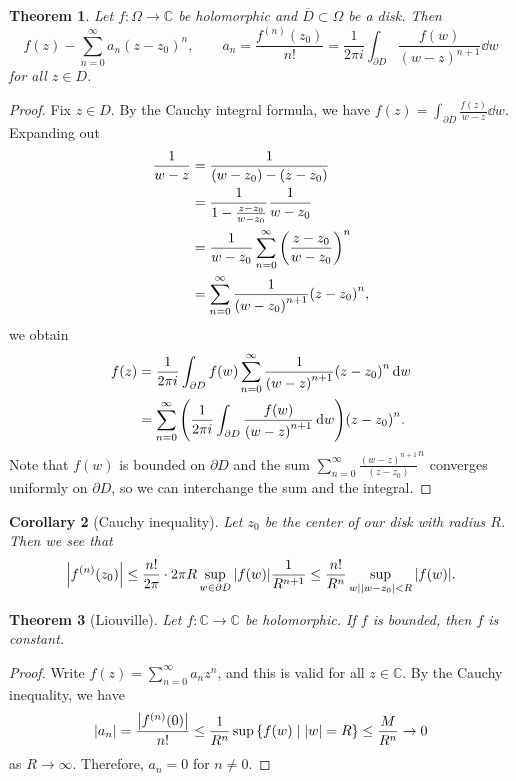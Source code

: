 \documentclass[leqno, openany]{memoir}
\newtheorem{thm}{Theorem}[section]
\newtheorem{cor}[thm]{Corollary}
\theoremstyle{definition}
\theoremstyle{remark}
\theoremstyle{plain}
\theoremstyle{definition}
\theoremstyle{remark}
\newcommand{\C}{\mathbb{C}}
\newcommand{\ol}[1]{\overline{#1}}
\begin{document}
\begin{thm}
    Let $f \colon \Omega \to \C$ be holomorphic and $\ol{D} \subset \Omega$ be a disk. Then 
    \[ f(z) - \sum_{n=0}^{\infty} a_n{(z-z_0)}^n, \qquad a_n = \frac{f^{(n)}(z_0)}{n!} = \frac{1}{2 \pi i} \int_{\partial D} \frac{f(w)}{{(w-z)}^{n+1}} \dd{w} \]
    for all $z \in D$.
\end{thm}

\begin{proof}
    Fix $z \in D$. By the Cauchy integral formula, we have $f(z) = \int_{\partial D} \frac{f(z)}{w-z} \dd{w}$. Expanding out
    \begin{align*} 
        \frac{1}{w-z} &= \frac{1}{(w-z_0) - (z-z_0)} \\
                      &= \frac{1}{1-\frac{z-z_0}{w-z_0}} \frac{1}{w-z_0} \\
                      &= \frac{1}{w-z_0} \sum_{n=0}^{\infty} {\qty(\frac{z-z_0}{w-z_0})}^n \\
                      &= \sum_{n=0}^{\infty} \frac{1}{{(w-z_0)}^{n+1}} {(z-z_0)}^n,
    \end{align*}
    we obtain
    \begin{align*}
        f(z) &= \frac{1}{2 \pi i} \int_{\partial D} f(w) \sum_{n=0}^{\infty} \frac{1}{{(w-z)}^{n+1}} {(z-z_0)}^n \dd{w} \\
             &= \sum_{n=0}^{\infty} \qty(\frac{1}{2 \pi i} \int_{\partial D} \frac{f(w)}{{(w-z)}^{n+1}} \dd{w}) {(z-z_0)}^n.
    \end{align*}
    Note that $f(w)$ is bounded on $\partial D$ and the sum $\sum_{n=0}^{\infty} \frac{{(w-z)}^{n+1}}{(z-z_0)}^n$ converges uniformly on $\partial D$, so we can interchange the sum and the integral.
\end{proof}

\begin{cor}[Cauchy inequality]
    Let $z_0$ be the center of our disk with radius $R$. Then we see that
    \[ \abs{f^{(n)}(z_0)} \leq \frac{n!}{2\pi} \cdot 2 \pi R \sup_{w \in \partial D} \abs{f(w)} \frac{1}{R^{n+1}} \leq \frac{n!}{R^n} \sup_{w \mid \abs{w-z_0} < R} \abs{f(w)}. \]
\end{cor}

\begin{thm}[Liouville]
    Let $f \colon \C \to \C$ be holomorphic. If $f$ is bounded, then $f$ is constant.
\end{thm}

\begin{proof}
    Write $f(z) = \sum_{n=0}^{\infty} a_n z^n$, and this is valid for all $z \in \C$. By the Cauchy inequality, we have
    \[ \abs{a_n} = \frac{\abs{f^{(n)}(0)}}{n!} \leq \frac{1}{R^n} \sup \qty{f(w) \mid \abs{w} = R} \leq \frac{M}{R^n} \to 0 \]
    as $R \to \infty$. Therefore, $a_n = 0$ for $n \neq 0$.
\end{proof}
\end{document}
